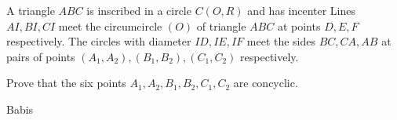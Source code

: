 A triangle $ ABC$ is inscribed in a circle $ C(O,R)$  and has incenter  Lines $ AI,BI,CI$ meet the circumcircle $ (O)$ of triangle $ ABC$ at points $ D,E,F$ respectively. The circles with diameter $ ID,IE,IF$ meet the sides $ BC,CA, AB$ at pairs of points $ (A_1,A_2), (B_1, B_2), (C_1, C_2)$ respectively.

Prove that the six points $ A_1,A_2, B_1, B_2, C_1, C_2$ are concyclic.


Babis